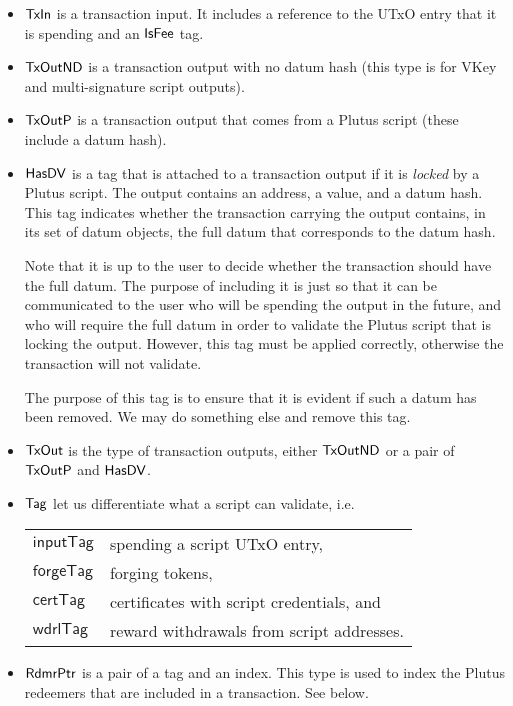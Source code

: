 \begin{itemize}
  \item $\mathsf{TxIn}$ is a transaction input. It includes a reference to the UTxO entry that it is spending
  and an $\mathsf{IsFee}$ tag.

  \item $\mathsf{TxOutND}$ is a transaction output with no datum hash
  (this type is for VKey and multi-signature script outputs).

  \item $\mathsf{TxOutP}$ is a transaction output that comes from a Plutus script (these include a datum hash).

  \item $\mathsf{HasDV}$
  is a tag that is attached to a transaction output if it is \emph{locked} by a Plutus
  script. The output contains an address, a value, and a datum hash.
  This tag indicates whether the transaction carrying the output
  contains, in its set of datum objects, the full datum that corresponds
  to the datum hash.

  Note that it is up to the user to decide whether the transaction should have the full datum. The purpose of
  including it is just so that it can be communicated to the user who will be spending
  the output in the future, and who will require the full datum in order to validate
  the Plutus script that is locking the output. However, this tag must be applied
  correctly, otherwise the transaction will not validate.
  \begin{note}
    The purpose of this tag is to ensure that it is evident if such a
    datum has been removed. We may do something else and remove this tag.
  \end{note}

  \item $\mathsf{TxOut}$ is the type of transaction outputs, either
  $\mathsf{TxOutND}$ or a pair of $\mathsf{TxOutP}$ and $\mathsf{HasDV}$.

  \item $\mathsf{Tag}$ let us differentiate what a script
  can validate, i.e. \\

  \begin{tabular}{l@{~to validate~}l}
  $\mathsf{inputTag}$ & spending a script UTxO entry, \\
  $\mathsf{forgeTag}$ & forging tokens, \\
  $\mathsf{certTag}$  & certificates with script credentials, and  \\
  $\mathsf{wdrlTag}$ & reward withdrawals from script addresses.
  \end{tabular}

  \item $\mathsf{RdmrPtr}$ is a pair of a tag and an index. This type is
  used to index the Plutus redeemers that are included in a transaction. See
  below.

\end{itemize}


